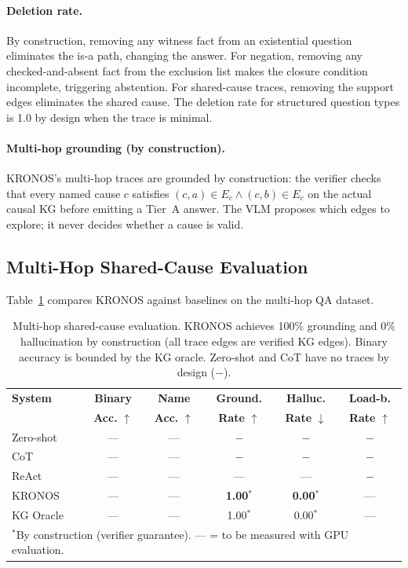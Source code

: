 \documentclass[runningheads]{llncs}
\begin{document}
\paragraph{Deletion rate.}
By construction, removing any witness fact from an existential question
eliminates the is-a path, changing the answer. For negation, removing any
checked-and-absent fact from the exclusion list makes the closure condition
incomplete, triggering abstention. For shared-cause traces, removing the
support edges eliminates the shared cause. The deletion rate for structured
question types is 1.0 by design when the trace is minimal.

\paragraph{Multi-hop grounding (by construction).}
KRONOS's multi-hop traces are grounded by construction: the verifier checks
that every named cause $c$ satisfies
$(c, a) \in E_c \wedge (c, b) \in E_c$ on the actual causal KG before
emitting a Tier~A answer. The VLM proposes which edges to explore; it
never decides whether a cause is valid.

\subsection{Multi-Hop Shared-Cause Evaluation}

Table~\ref{tab:multihop} compares KRONOS against baselines on the
multi-hop QA dataset.

\begin{table}[t]
\centering
\small
\caption{Multi-hop shared-cause evaluation. KRONOS achieves 100\%
  grounding and 0\% hallucination by construction (all trace edges are
  verified KG edges). Binary accuracy is bounded by the KG oracle.
  Zero-shot and CoT have no traces by design ($-$).}
\label{tab:multihop}
\begin{tabular}{lccccc}
\toprule
\textbf{System} & \textbf{Binary} & \textbf{Name} & \textbf{Ground.}
  & \textbf{Halluc.} & \textbf{Load-b.} \\
  & \textbf{Acc.} $\uparrow$ & \textbf{Acc.} $\uparrow$
  & \textbf{Rate} $\uparrow$ & \textbf{Rate} $\downarrow$
  & \textbf{Rate} $\uparrow$ \\
\midrule
Zero-shot  & ---  & ---  & $-$    & $-$    & $-$ \\
CoT        & ---  & ---  & $-$    & $-$    & $-$ \\
ReAct      & ---  & ---  & ---    & ---    & $-$ \\
\midrule
KRONOS     & ---  & ---  & \textbf{1.00}$^*$ & \textbf{0.00}$^*$ & --- \\
\midrule
KG Oracle  & ---  & ---  & 1.00$^*$ & 0.00$^*$ & --- \\
\bottomrule
\multicolumn{6}{l}{\footnotesize $^*$By construction (verifier guarantee).
  --- = to be measured with GPU evaluation.}
\end{tabular}
\end{table}
\end{document}
